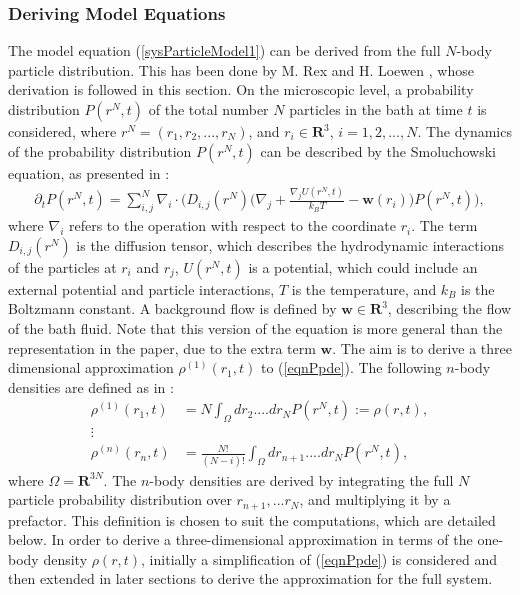 \subsubsection{Deriving Model Equations}
The model equation (\ref{sysParticleModel1}) can be derived from the full $N$-body particle distribution. This has been done by M. Rex and H. Loewen \cite{RexLoewen1}, whose derivation is followed in this section.	
On the microscopic level, a probability distribution $P(r^N,t)$ of the total number $N$ particles in the bath at time $t$ is considered, where $r^N= (r_1, r_2,...,r_N)$, and $r_i \in \mathbf{R}^3$, $i=1,2,...,N$. 
The dynamics of the probability distribution $P(r^N,t)$ can be described by the Smoluchowski equation, as presented in \cite{RexLoewen1}:
\begin{align} \label{eqnPpde}
\partial_t P(r^N,t)= \sum_{i,j}^N \nabla_i \cdot \bigg( D_{i,j}(r^N) \bigg( \nabla_j + \frac{\nabla_j U(r^N,t)}{k_BT} - \mathbf{w}(r_i) \bigg) P(r^N,t) \bigg),
\end{align}
where $\nabla_i$ refers to the operation with respect to the coordinate $r_i$. The term $D_{i,j}(r^N)$ is the diffusion tensor, which describes the hydrodynamic interactions of the particles at $r_i$ and $r_j$, $U(r^N,t)$ is a potential, which could include an external potential and particle interactions, $T$ is the temperature, and $k_B$ is the Boltzmann constant. A background flow is defined by $\mathbf{w} \in \mathbf{R}^3$, describing the flow of the bath fluid.
 Note that this version of the equation is more general than the representation in the paper, due to the extra term $\mathbf{w}$. The aim is to derive a three dimensional approximation $\rho^{(1)}(r_1,t)$ to (\ref{eqnPpde}). The following $n$-body densities are defined as in \cite{RexLoewen1}:
\begin{align*}
\rho^{(1)}(r_1,t) &= N \int_\Omega dr_2.... dr_N P(r^N,t):= \rho(r,t),\\
\vdots\\
\rho^{(n)}(r_n,t) &= \frac{N!}{(N-i)!} \int_\Omega dr_{n+1}.... dr_N P(r^N,t),
\end{align*} 
where $\Omega=\mathbf{R}^{3N}$.
The $n$-body densities are derived by integrating the full $N$ particle probability distribution over $r_{n+1},...r_N$, and multiplying it by a prefactor. This definition is chosen to suit the computations, which are detailed below.
In order to derive a three-dimensional approximation in terms of the one-body density $\rho(r,t)$, initially a simplification of (\ref{eqnPpde}) is considered and then extended in later sections to derive the approximation for the full system. 

